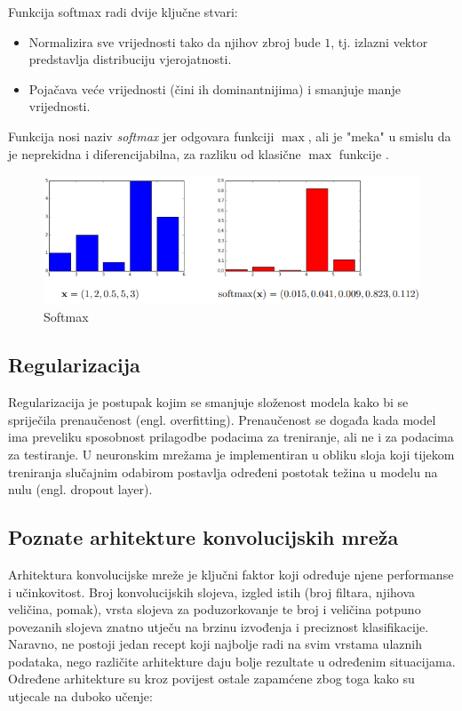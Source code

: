 Funkcija softmax radi dvije ključne stvari:
\begin{itemize}
    \item Normalizira sve vrijednosti tako da njihov zbroj bude \( 1 \), tj. izlazni vektor 
        predstavlja distribuciju vjerojatnosti.
    \item Pojačava veće vrijednosti (čini ih dominantnijima) i smanjuje manje vrijednosti.
\end{itemize}

Funkcija nosi naziv \textit{softmax} jer odgovara funkciji \( \max \), ali je "meka" u smislu
da je neprekidna i diferencijabilna, za razliku od klasične \( \max \) funkcije 
\cite{snajder2023logreg}.

\begin{figure}[htb]
    \centering
    \includegraphics[width=0.6\linewidth]{Chapters/neuronska_mreza/CNN/softmax.png} 
    \caption{Softmax \cite{snajder2023logreg}}
    \label{pic:softmax}
\end{figure}

\subsection{Regularizacija}
Regularizacija je postupak kojim se smanjuje složenost modela kako bi se spriječila
prenaučenost (engl. overfitting). Prenaučenost se događa kada model ima preveliku  
sposobnost prilagodbe podacima za treniranje, ali ne i za podacima za testiranje.
U neuronskim mrežama je implementiran u obliku sloja koji tijekom
treniranja slučajnim odabirom postavlja određeni postotak 
težina u modelu na nulu (engl. dropout layer).

\subsection{Poznate arhitekture konvolucijskih mreža}
Arhitektura konvolucijske mreže je ključni faktor koji određuje njene performanse i
učinkovitost. Broj konvolucijskih slojeva, izgled istih (broj filtara, njihova veličina,
pomak), vrsta slojeva za poduzorkovanje te broj i veličina potpuno povezanih slojeva znatno
utječu na brzinu izvođenja i preciznost klasifikacije. Naravno, ne postoji jedan recept koji
najbolje radi na svim vrstama ulaznih podataka, nego različite arhitekture daju bolje rezultate
u određenim situacijama. Određene arhitekture su kroz povijest ostale zapamćene zbog
toga kako su utjecale na duboko učenje\cite{indian}:

